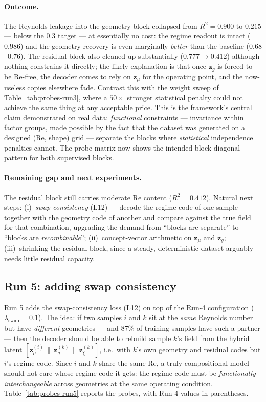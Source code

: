 \documentclass[11pt]{article}
\begin{document}
\paragraph{Outcome.} The Reynolds leakage into the geometry block
collapsed from $R^2 = 0.900$ to $0.215$ --- below the $0.3$ target ---
at essentially no cost: the regime readout is intact ($0.986$) and the
geometry recovery is even marginally \emph{better} than the baseline
($0.68$--$0.76$). The residual block also cleaned up substantially
($0.777 \to 0.412$) although nothing constrains it directly; the likely
explanation is that once $\boldsymbol{z}_{g}$ is forced to be Re-free,
the decoder comes to rely on $\boldsymbol{z}_{\mu}$ for the operating
point, and the now-useless copies elsewhere fade. Contrast this with the
weight sweep of Table~\ref{tab:probes-run3}, where a $50\times$ stronger
statistical penalty could not achieve the same thing at any acceptable
price. This is the framework's central claim demonstrated on real data:
\emph{functional} constraints --- invariance within factor groups, made
possible by the fact that the dataset was generated on a designed
(Re, shape) grid --- separate the blocks where \emph{statistical}
independence penalties cannot. The probe matrix now shows the intended
block-diagonal pattern for both supervised blocks.

\paragraph{Remaining gap and next experiments.} The residual block still
carries moderate Re content ($R^2 = 0.412$). Natural next steps:
(i)~\emph{swap consistency} (L12) --- decode the regime code of one
sample together with the geometry code of another and compare against the
true field for that combination, upgrading the demand from ``blocks are
separate'' to ``blocks are \emph{recombinable}'';
(ii)~concept-vector arithmetic on $\boldsymbol{z}_{\mu}$ and
$\boldsymbol{z}_{g}$; (iii)~shrinking the residual block, since a steady,
deterministic dataset arguably needs little residual capacity.

\subsection{Run 5: adding swap consistency}

Run 5 adds the swap-consistency loss (L12) on top of the Run-4
configuration ($\lambda_{\mathrm{swap}} = 0.1$). The idea: if two samples
$i$ and $k$ sit at the \emph{same} Reynolds number but have
\emph{different} geometries --- and 87\% of training samples have such a
partner --- then the decoder should be able to rebuild sample $k$'s field
from the hybrid latent
$[\boldsymbol{z}_{\mu}^{(i)} \,\|\, \boldsymbol{z}_{g}^{(k)} \,\|\,
\boldsymbol{z}_{\xi}^{(k)}]$, i.e.\ with $k$'s own geometry and residual
codes but $i$'s regime code. Since $i$ and $k$ share the same Re, a truly
compositional model should not care whose regime code it gets: the regime
code must be \emph{functionally interchangeable} across geometries at the
same operating condition. Table~\ref{tab:probes-run5} reports the probes,
with Run-4 values in parentheses.
\end{document}
